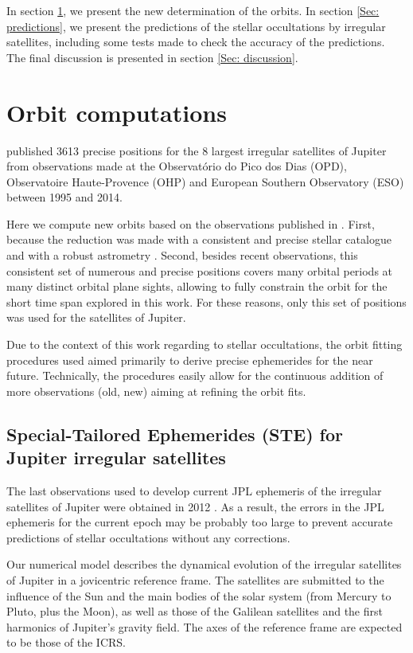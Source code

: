 \documentclass[useAMS,usenatbib]{mn2e}
\begin{document}
In section \ref{Sec: integration}, we present the new determination of the orbits. In section \ref{Sec: predictions}, we present the predictions of the stellar occultations by irregular satellites, including some tests made to check the accuracy of the predictions. The final discussion is presented in section \ref{Sec: discussion}.

\section{Orbit computations} \label{Sec: integration}

 published 3613 precise positions for the 8 largest irregular satellites of Jupiter from observations made at the Observatório do Pico dos Dias (OPD), Observatoire Haute-Provence (OHP) and European Southern Observatory (ESO) between 1995 and 2014. 

Here we compute new orbits based on the observations published in . First, because the reduction was made with a consistent and precise stellar catalogue and with a robust astrometry \citep[PRAIA,][]{Assafin2011}. Second, besides recent observations, this consistent set of numerous and precise positions covers many orbital periods at many distinct orbital plane sights, allowing to fully constrain the orbit for the short time span explored in this work. For these reasons, only this set of positions was used for the satellites of Jupiter.

Due to the context of this work regarding to stellar occultations, the orbit fitting procedures used aimed primarily to derive precise ephemerides for the near future. Technically, the procedures easily allow for the continuous addition of more observations (old, new) aiming at refining the orbit fits.

\subsection{Special-Tailored Ephemerides (STE) for Jupiter irregular satellites}

The last observations used to develop current JPL ephemeris of the irregular satellites of Jupiter were obtained in 2012 \citep{Jacobson2012}. As a result, the errors in the JPL ephemeris for the current epoch may be probably too large to prevent accurate predictions of stellar occultations without any corrections.

Our numerical model describes the dynamical evolution of the irregular satellites of Jupiter in a jovicentric reference frame. The satellites are submitted to the influence of the Sun and the main bodies of the solar system (from Mercury to Pluto, plus the Moon), as well as those of the Galilean satellites and the first harmonics of Jupiter's gravity field. The axes of the reference frame are expected to be those of the ICRS.
\end{document}
